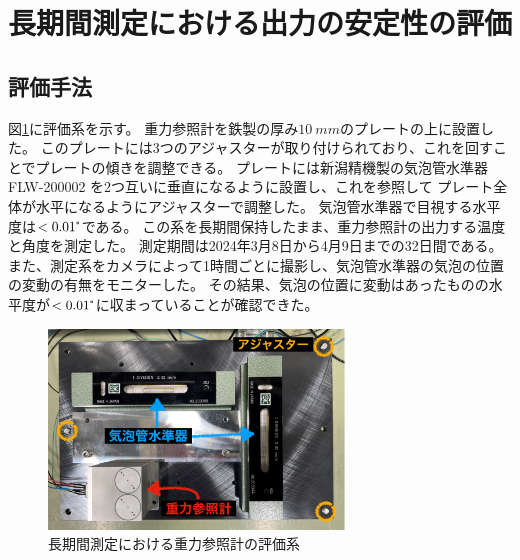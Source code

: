 \documentclass[../../main.tex]{subfiles}
\begin{document}
\section{長期間測定における出力の安定性の評価}
\subsection{評価手法}
図\ref{fig:timedrift_evaluation_system}に評価系を示す。
重力参照計を鉄製の厚み$\SI{10}{mm}$のプレートの上に設置した。
このプレートには3つのアジャスターが取り付けられており、これを回すことでプレートの傾きを調整できる。
プレートには新潟精機製の気泡管水準器 FLW-200002 を2つ互いに垂直になるように設置し、これを参照して
プレート全体が水平になるようにアジャスターで調整した。
気泡管水準器で目視する水平度は$<0.01\tcdegree$である。
この系を長期間保持したまま、重力参照計の出力する温度と角度を測定した。
測定期間は2024年3月8日から4月9日までの32日間である。
また、測定系をカメラによって1時間ごとに撮影し、気泡管水準器の気泡の位置の変動の有無をモニターした。
その結果、気泡の位置に変動はあったものの水平度が$<0.01\tcdegree$に収まっていることが確認できた。
\begin{figure}[H]
    \centering
    \includegraphics[width=0.7\textwidth]{tiltsensor/timedrift_evaluation_system.pdf}
    \caption{長期間測定における重力参照計の評価系}
    \label{fig:timedrift_evaluation_system}
\end{figure}
\end{document}
